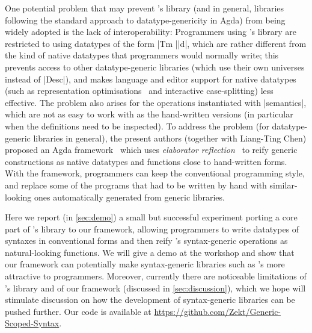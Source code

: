 \documentclass[sigplan,review,fleqn]{acmart}
\renewcommand{\verb}{\collectverb{\color{AgdaFunction}}}
\newcommand{\name}{\collectverb{\it}}
\begin{document}
One potential problem that may prevent \citeauthor{Allais-generic-syntax}'s library (and in general,  libraries following the standard approach to datatype-genericity in Agda) from being widely adopted is the lack of interoperability:
Programmers using \citeauthor{Allais-generic-syntax}'s library are restricted to using datatypes of the form \verb|Tm |\name|d|, which are rather different from the kind of native datatypes that programmers would normally write; this prevents access to other datatype-generic libraries (which use their own universes instead of \verb|Desc|), and makes language and editor support for native datatypes (such as representation optimisations~\citep{Brady-inductive-families-indices} and interactive case-splitting) less effective.
The problem also arises for the operations instantiated with \verb|semantics|, which are not as easy to work with as the hand-written versions (in particular when the definitions need to be inspected).
To address the problem (for datatype-generic libraries in general), the present authors (together with Liang-Ting Chen) proposed an Agda framework~\citep{Ko-NDGP} which uses \emph{elaborator reflection}~\citep{Christiansen-elaborator-reflection} to reify generic constructions as native datatypes and functions close to hand-written forms.
With the framework, programmers can keep the conventional programming style, and replace some of the programs that had to be written by hand with similar-looking ones automatically generated from generic libraries.

Here we report (in \cref{sec:demo}) a small but successful experiment porting a core part of \citeauthor{Allais-generic-syntax}'s library to our framework, allowing programmers to write datatypes of syntaxes in conventional forms and then reify \citeauthor{Allais-generic-syntax}'s syntax-generic operations as natural-looking functions.
We will give a demo at the workshop and show that our framework can potentially make syntax-generic libraries such as \citeauthor{Allais-generic-syntax}'s more attractive to programmers.
Moreover, currently there are noticeable limitations of \citeauthor{Allais-generic-syntax}'s library and of our framework (discussed in \cref{sec:discussion}), which we hope will stimulate discussion on how the development of syntax-generic libraries can be pushed further.
Our code is available at \url{https://github.com/Zekt/Generic-Scoped-Syntax}.
\end{document}
